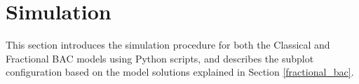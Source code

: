\documentclass[11pt]{article}
\begin{document}

\section{Simulation}


This section introduces the simulation procedure for both the Classical and Fractional BAC models using Python scripts, and describes the subplot configuration based on the model solutions explained in Section \ref{fractional_bac}.
\end{document}
